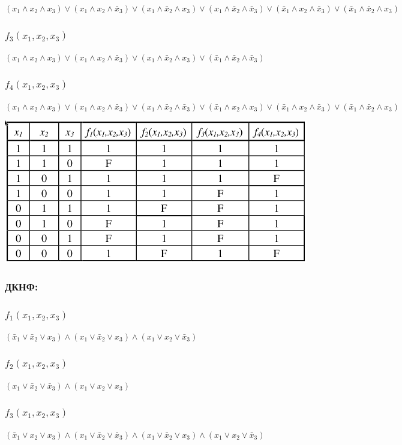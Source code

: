 \documentclass[14pt,]{extreport}
\begin{document}
$
(	x_1\land x_2\land x_3)\lor
(	x_1\land x_2\land \bar x_3)\lor
(	x_1\land \bar x_2\land x_3)\lor
(	x_1\land \bar x_2\land \bar x_3)\lor
(	\bar x_1\land x_2\land \bar x_3)\lor
(	\bar x_1\land \bar x_2\land x_3)
$

\subsubsection{$f_3(x_1,x_2,x_3)$}
$
(	x_1\land x_2\land x_3)\lor
(	x_1\land x_2\land \bar x_3)\lor
(	x_1\land \bar x_2\land x_3)\lor
(	\bar x_1\land \bar x_2\land \bar x_3)
$

\subsubsection{$f_4(x_1,x_2,x_3)$}
$
(	x_1\land x_2\land x_3)\lor
(	x_1\land x_2\land \bar x_3)\lor
(	x_1\land \bar x_2\land \bar x_3)\lor
(	\bar x_1\land x_2\land x_3)\lor
(	\bar x_1\land x_2\land \bar x_3)\lor
(	\bar x_1\land \bar x_2\land x_3)
$

\begin{center}
\includegraphics[width=.7\textwidth]{table.png}
\end{center}

\subsubsection*{ДКНФ:}

\subsubsection{$f_1(x_1,x_2,x_3)$}
$
(\bar x_1\lor \bar x_2 \lor x_3)\land
(x_1\lor \bar x_2\lor x_3)\land
(x_1\lor x_2\lor \bar x_3)
$
\subsubsection{$f_2(x_1,x_2,x_3)$}
$
(x_1\lor \bar x_2\lor \bar x_3)\land
(x_1\lor x_2\lor x_3)
$
\subsubsection{$f_3(x_1,x_2,x_3)$}
$
(\bar x_1\lor x_2\lor x_3)\land
(x_1\lor \bar x_2\lor \bar x_3)\land
(x_1\lor \bar x_2\lor x_3)\land
(x_1\lor x_2\lor \bar x_3)
$
\end{document}
